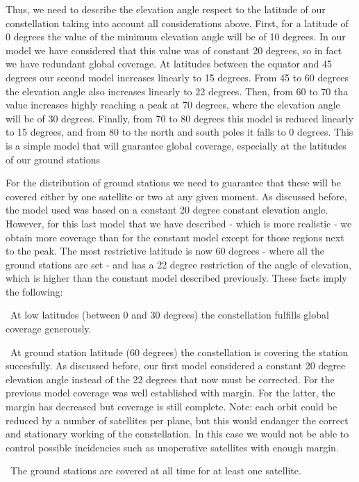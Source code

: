 Thus, we need to describe the elevation angle respect to the latitude of our constellation taking into account all considerations above. First, for a latitude of 0 degrees the value of the minimum elevation angle will be of 10 degrees. In our model we have considered that this value was of constant 20 degrees, so in fact we have redundant global coverage. At latitudes between the equator and 45 degrees our second model increases linearly to 15 degrees. From 45 to 60 degrees the elevation angle also increases linearly to 22 degrees. Then, from 60 to 70 tha value increases highly reaching a peak at 70 degrees, where the elevation angle will be of 30 degrees. Finally, from 70 to 80 degrees this model is reduced linearly to 15 degrees, and from 80 to the north and south poles it falls to 0 degrees. This is a simple model that will guarantee global coverage, especially at the latitudes of our ground stations

For the distribution of ground stations we need to guarantee that these will be covered either by one satellite or two at any given moment. As discussed before, the model used was based on a constant 20 degree constant elevation angle. However, for this last model that we have described - which is more realistic - we obtain more coverage than for the constant model except for those regions next to the peak. The most restrictive latitude is now 60 degrees - where all the ground stations are set - and has a 22 degree restriction of the angle of elevation, which is higher than the constant model described previously. These facts imply the following:

\textendash\  At low latitudes (between 0 and 30 degrees) the constellation fulfills global coverage generously.

\textendash\ At ground station latitude (60 degrees) the constellation is covering the station succesfully. As discussed before, our first model considered a constant 20 degree elevation angle instead of the 22 degrees that now must be corrected. For the previous model coverage was well established with margin. For the latter, the margin has decreased but coverage is still complete. Note: each orbit could be reduced by a number of satellites per plane, but this would endanger the correct and stationary working of the constellation. In this case we would not be able to control possible incidencies such as unoperative satellites with enough margin.

\textendash\ The ground stations are covered at all time for at least one satellite.

